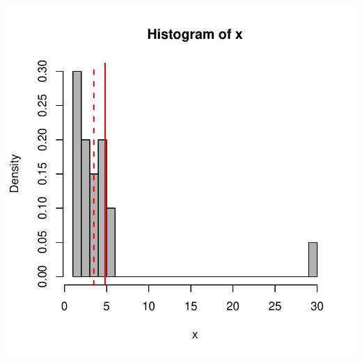 \documentclass{beamer}\usepackage[]{graphicx}\usepackage[]{color}
\newenvironment{knitrout}{}{} %
\renewenvironment{knitrout}{\setlength{\topsep}{0mm}}{}
\begin{document}
\begin{frame}[fragile]
\begin{columns}[c]
\centering
\begin{knitrout}
\color{fgcolor}
\includegraphics[width=1.1\linewidth]{figure/unnamed-chunk-17-1} 

\end{knitrout}

\end{columns}

\end{frame} 
\end{document}

